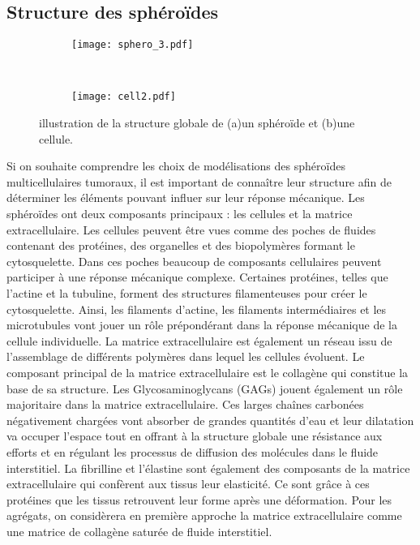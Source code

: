 \subsection{Structure des sphéroïdes}
\begin{figure}[ht!]
\begin{subfigure}{0.49\textwidth}
\texttt{[image: sphero\_3.pdf]}
\caption{\label{spheroid}}
\end{subfigure}
~~
\begin{subfigure}{0.49\textwidth}
\texttt{[image: cell2.pdf]}
\caption{\label{cell}}
\end{subfigure}
\caption{illustration de la structure globale de (a)un sphéroïde  et (b)une cellule.}
\end{figure}
Si on souhaite comprendre les choix de modélisations des sphéroïdes multicellulaires tumoraux, il est important de connaître leur structure afin de déterminer les éléments pouvant influer sur leur réponse mécanique. Les sphéroïdes ont deux composants principaux : les cellules et la matrice extracellulaire. Les cellules peuvent être vues comme des poches de fluides contenant des protéines, des organelles et des biopolymères formant le cytosquelette. Dans ces poches beaucoup de composants cellulaires peuvent participer à une réponse mécanique complexe. Certaines protéines, telles que l'actine et la tubuline, forment des structures filamenteuses pour créer le cytosquelette. Ainsi, les filaments d'actine, les filaments intermédiaires et les microtubules vont jouer un rôle prépondérant dans la réponse mécanique de la cellule individuelle.\cite{Pachenari2014} La matrice extracellulaire est également un réseau issu de l'assemblage de différents polymères dans lequel les cellules évoluent. Le composant principal de la matrice extracellulaire est le collagène qui constitue la base de sa structure. Les Glycosaminoglycans (GAGs) jouent également un rôle majoritaire dans la matrice extracellulaire. Ces larges chaînes carbonées négativement chargées vont absorber de grandes quantités d'eau et leur dilatation va occuper l'espace tout en offrant à la structure globale une résistance aux efforts et en régulant les processus de diffusion des molécules dans le fluide interstitiel.\cite{Alberts2002}\cite{Hamilton1998} La fibrilline et l'élastine sont également des composants de la matrice extracellulaire qui confèrent aux tissus leur elasticité. Ce sont grâce à ces protéines que les tissus retrouvent leur forme après une déformation.\cite{Alberts2002}  Pour les agrégats, on considèrera en première approche la matrice extracellulaire comme une matrice de collagène saturée de fluide interstitiel.

